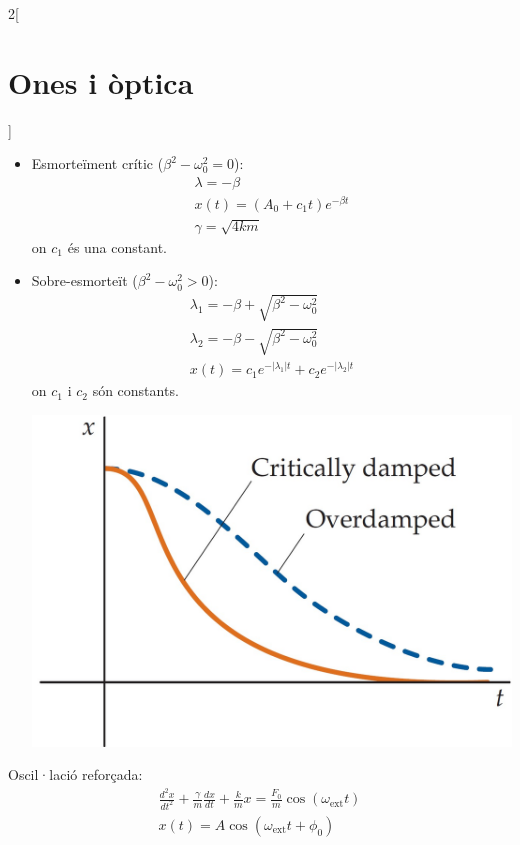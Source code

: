 \documentclass[../../../main.tex]{subfiles}
\begin{document}
\begin{multicols}{2}[\section{Ones i òptica}]
\begin{itemize}
\begin{minipage}{\linewidth}
          \end{minipage}
    \item Esmorteïment crític ($\beta^2 -\omega_0^2=0$):
          \begin{gather*}
            \lambda=-\beta\\
            x(t)=(A_0+c_1t)e^{-\beta t}\\
            \gamma=\sqrt{4km}
          \end{gather*}
          {\footnotesize on $c_1$ és una constant.}
    \item Sobre-esmorteït ($\beta^2-\omega_0^2>0$):
          \begin{gather*}
            \lambda_1=-\beta+\sqrt{\beta^2-\omega_0^2}\\
            \lambda_2=-\beta-\sqrt{\beta^2-\omega_0^2}\\
            x(t)=c_1e^{-|\lambda_1|t}+c_2e^{-|\lambda_2|t}
          \end{gather*}
          {\footnotesize on $c_1$ i $c_2$ són constants.}\newline
          \begin{minipage}{\linewidth}
            \centering
            \includegraphics[width=\linewidth]{Physics/1st/Waves_and_optics/Images/cdamp.jpg}
          \end{minipage}
  \end{itemize}
  Oscil·lació reforçada:
  \begin{gather*}
    \frac{d^2x}{dt^2}+\frac{\gamma}{m}\frac{dx}{dt}+\frac{k}{m}x=\frac{F_0}{m}\cos(\omega_{\text{ext}}t)\\
    x(t)=A\cos(\omega_\text{ext}t+\phi_0)\\

\end{gather*}
\end{multicols}
\end{document}
